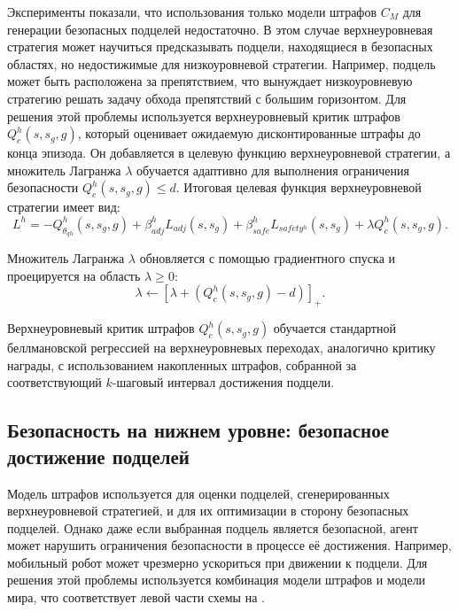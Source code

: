 \noindent
Эксперименты показали, что использования только модели штрафов $C_M$ для генерации безопасных подцелей недостаточно. В этом случае верхнеуровневая стратегия может научиться предсказывать подцели, находящиеся в безопасных областях, но недостижимые для низкоуровневой стратегии. Например, подцель может быть расположена за препятствием, что вынуждает низкоуровневую стратегию решать задачу обхода препятствий с большим горизонтом. Для решения этой проблемы используется верхнеуровневый критик штрафов $Q^h_c(s, s_g, g)$, который оценивает ожидаемую дисконтированные штрафы до конца эпизода. Он добавляется в целевую функцию верхнеуровневой стратегии, а множитель Лагранжа $\lambda$ обучается адаптивно для выполнения ограничения безопасности $Q^h_c(s, s_g, g) \leq d$. Итоговая целевая функция верхнеуровневой стратегии имеет вид:
\begin{equation}
    \label{eq:ites_high_level_policy_update}
    L^h
    =
    -Q^h_{\theta_{qh}}(s,s_g,g)
    +
    \beta^h_{adj} L_{adj}(s,s_g)
    +
    \beta^h_{safe} L_{safety^h}(s,s_g)
    +
    \lambda Q^h_c(s,s_g,g).
\end{equation}

Множитель Лагранжа $\lambda$ обновляется с помощью градиентного спуска и проецируется на область $\lambda \ge 0$:
\begin{equation}
    \label{eq:ites_lambda_update}
    \lambda
    \leftarrow
    \left[
        \lambda
        +
        \left(
            Q^h_c(s,s_g,g)-d
        \right)
    \right]_+.
\end{equation}

Верхнеуровневый критик штрафов $Q^h_c(s, s_g, g)$ обучается стандартной беллмановской регрессией на верхнеуровневых переходах, аналогично критику награды, с использованием накопленных штрафов, собранной за соответствующий $k$-шаговый интервал достижения подцели.

\subsection{Безопасность на нижнем уровне: безопасное достижение подцелей}
\label{subsec:ites_low_level_safety}

Модель штрафов используется для оценки подцелей, сгенерированных верхнеуровневой стратегией, и для их оптимизации в сторону безопасных подцелей. Однако даже если выбранная подцель является безопасной, агент может нарушить ограничения безопасности в процессе её достижения. Например, мобильный робот может чрезмерно ускориться при движении к подцели. Для решения этой проблемы используется комбинация модели штрафов и модели мира, что соответствует левой части схемы на .

